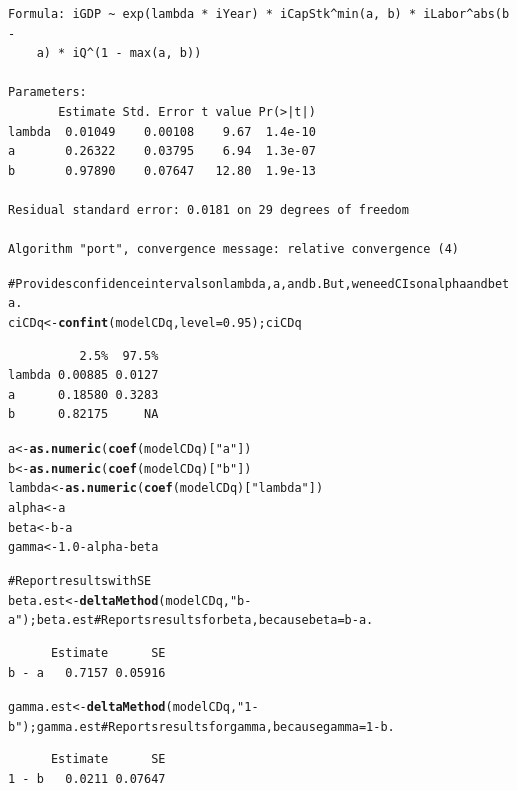 \documentclass[preprint,authoryear,12pt]{elsarticle}\usepackage{graphicx, color}
\makeatletter
\newcommand{\hlfunctioncall}[1]{\textcolor[rgb]{0.501960784313725,0,0.329411764705882}{\textbf{#1}}}%
\newcommand{\hlstring}[1]{\textcolor[rgb]{0.6,0.6,1}{#1}}%
\newcommand{\hlcomment}[1]{\textcolor[rgb]{0.180392156862745,0.6,0.341176470588235}{#1}}%
\newenvironment{kframe}{%
 \def\at@end@of@kframe{}%
 \ifinner\ifhmode%
  \def\at@end@of@kframe{\end{minipage}}%
  \begin{minipage}{\columnwidth}%
 \fi\fi%
 \def\FrameCommand##1{\hskip\@totalleftmargin \hskip-\fboxsep
 \colorbox{shadecolor}{##1}\hskip-\fboxsep
     \hskip-\linewidth \hskip-\@totalleftmargin \hskip\columnwidth}%
 \MakeFramed {\advance\hsize-\width
   \@totalleftmargin\z@ \linewidth\hsize
   \@setminipage}}%
 {\par\unskip\endMakeFramed%
 \at@end@of@kframe}
\newenvironment{knitrout}{}{} %
\makeatother
\begin{document}
\begin{knitrout}
\begin{kframe}
\begin{verbatim}
Formula: iGDP ~ exp(lambda * iYear) * iCapStk^min(a, b) * iLabor^abs(b - 
    a) * iQ^(1 - max(a, b))

Parameters:
       Estimate Std. Error t value Pr(>|t|)
lambda  0.01049    0.00108    9.67  1.4e-10
a       0.26322    0.03795    6.94  1.3e-07
b       0.97890    0.07647   12.80  1.9e-13

Residual standard error: 0.0181 on 29 degrees of freedom

Algorithm "port", convergence message: relative convergence (4) 
\end{verbatim}
\begin{alltt}

\hlcomment{# Provides confidence intervals on lambda, a, and b. But, we need CIs on alpha and beta.}
ciCDq <- \hlfunctioncall{confint}(modelCDq, level = 0.95); ciCDq 
\end{alltt}


{\ttfamily\noindent\itshape\color{messagecolor}{Waiting for profiling to be done...}}\begin{verbatim}
          2.5%  97.5%
lambda 0.00885 0.0127
a      0.18580 0.3283
b      0.82175     NA
\end{verbatim}
\begin{alltt}

a <- \hlfunctioncall{as.numeric}(\hlfunctioncall{coef}(modelCDq)[\hlstring{"a"}])
b <- \hlfunctioncall{as.numeric}(\hlfunctioncall{coef}(modelCDq)[\hlstring{"b"}])
lambda <- \hlfunctioncall{as.numeric}(\hlfunctioncall{coef}(modelCDq)[\hlstring{"lambda"}])
alpha <- a
beta <- b - a
gamma <- 1.0 - alpha - beta

\hlcomment{# Report results with SE}
beta.est <- \hlfunctioncall{deltaMethod}(modelCDq, \hlstring{"b-a"}); beta.est # Reports results for beta, because beta = b - a.
\end{alltt}
\begin{verbatim}
      Estimate      SE
b - a   0.7157 0.05916
\end{verbatim}
\begin{alltt}
gamma.est <- \hlfunctioncall{deltaMethod}(modelCDq, \hlstring{"1-b"}); gamma.est # Reports results for gamma, because gamma = 1 - b.
\end{alltt}
\begin{verbatim}
      Estimate      SE
1 - b   0.0211 0.07647
\end{verbatim}
\begin{alltt}


\end{alltt}
\end{kframe}
\end{knitrout}
\end{document}
